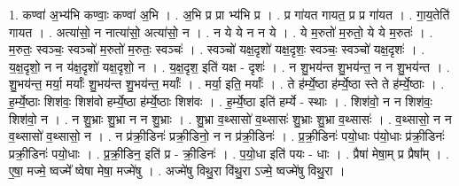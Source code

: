\documentclass[17pt]{extarticle}
\begin{document}
1. कण्वा॑ अ॒भ्य॑भि कण्वाः॒ कण्वा॑ अ॒भि । . अ॒भि प्र प्रा भ्य॑भि प्र । . प्र गा॑यत गायत॒ प्र प्र गा॑यत । . गा॒य॒तेति॑ गायत । . अत्या॑सो॒ न नात्या॑सो॒ अत्या॑सो॒ न । . न ये ये न न ये । . ये म॒रुतो॑ म॒रुतो॒ ये ये म॒रुतः॑ । . म॒रुतः॒ स्वञ्चः॒ स्वञ्चो॑ म॒रुतो॑ म॒रुतः॒ स्वञ्चः॑ । . स्वञ्चो॑ यक्ष॒दृशो॑ यक्ष॒दृशः॒ स्वञ्चः॒ स्वञ्चो॑ यक्ष॒दृशः॑ । . य॒क्ष॒दृशो॒ न न य॑क्ष॒दृशो॑ यक्ष॒दृशो॒ न । . य॒क्ष॒दृश॒ इति॑ यक्ष - दृशः॑ । . न शु॒भय॑न्त शु॒भय॑न्त॒ न न शु॒भय॑न्त । . शु॒भय॑न्त॒ मर्या॒ मर्याः᳚ शु॒भय॑न्त शु॒भय॑न्त॒ मर्याः᳚ । . मर्या॒ इति॒ मर्याः᳚ । . ते ह॑र्म्ये॒ष्ठा ह॑र्म्ये॒ष्ठा स्ते ते ह॑र्म्ये॒ष्ठाः । . ह॒र्म्ये॒ष्ठाः शिश॑वः॒ शिश॑वो हर्म्ये॒ष्ठा ह॑र्म्ये॒ष्ठाः शिश॑वः । . ह॒र्म्ये॒ष्ठा इति॑ हर्म्ये - स्थाः । . शिश॑वो॒ न न शिश॑वः॒ शिश॑वो॒ न । . न शु॒भ्राः शु॒भ्रा न न शु॒भ्राः । . शु॒भ्रा व॒थ्सासो॑ व॒थ्सासः॑ शु॒भ्राः शु॒भ्रा व॒थ्सासः॑ । . व॒थ्सासो॒ न न व॒थ्सासो॑ व॒थ्सासो॒ न । . न प्र॑क्री॒डिनः॑ प्रक्री॒डिनो॒ न न प्र॑क्री॒डिनः॑ । . प्र॒क्री॒डिनः॑ पयो॒धाः प॑यो॒धाः प्र॑क्री॒डिनः॑ प्रक्री॒डिनः॑ पयो॒धाः । . प्र॒क्री॒डिन॒ इति॑ प्र - क्री॒डिनः॑ । . प॒यो॒धा इति॑ पयः - धाः । . प्रैषा॑ मेषा॒म् प्र प्रैषा᳚म् । . ए॒षा॒ मज्मे॒ ष्वज्मे᳚ ष्वेषा मेषा॒ मज्मे॑षु । . अज्मे॑षु विथु॒रा वि॑थु॒रा ऽज्मे॒ ष्वज्मे॑षु विथु॒रा । \newline
\end{document}
